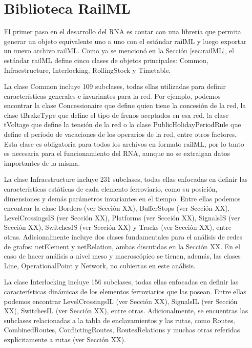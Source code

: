 \section{Biblioteca RailML}
	\label{sec:Biblioteca}
	
    El primer paso en el desarrollo del RNA es contar con una librería que permita generar un objeto equivalente uno a uno con el estándar railML y luego exportar un nuevo archivo railML. Como ya se mencionó en la Sección \ref{sec:railML}, el estándar railML define cinco clases de objetos principales: Common, Infraestructure, Interlocking, RollingStock y Timetable. 

    La clase Common incluye 109 subclases, todas ellas utilizadas para definir características generales e invariantes para la red. Por ejemplo, podemos encontrar la clase Concessionaire que define quien tiene la concesión de la red, la clase tBrakeType que define el tipo de frenos aceptados en esa red, la clase tVoltage que define la tensión de la red o la clase PublicHolidayPeriodRule que define el período de vacaciones de los operarios de la red, entre otros factores. Esta clase es obligatoria para todos los archivos en formato railML, por lo tanto es necesaria para el funcionamiento del RNA, aunque no se extraigan datos importantes de la misma.

    La clase Infraestructure incluye  231 subclases, todas ellas enfocadas en definir las características estáticas de cada elemento ferroviario, como su posición, dimensiones y demás parámetros invariantes en el tiempo.  Entre ellas podemos encontrar la clase Borders (ver Sección XX), BufferStops (ver Sección XX), LevelCrossingsIS (ver Sección XX), Platforms (ver Sección XX), SignalsIS (ver Sección XX), SwitchesIS (ver Sección XX) y Tracks (ver Sección XX), entre otras. Adicionalmente incluye dos clases fundamentales para el análisis de redes de grafos: netElement y netRelation, ambas discutidas en la Sección XX. En el caso de hacer análisis a nivel meso y macroscópico se tienen, además, las clases Line, OperationalPoint y Network, no cubiertas en este análisis.

    La clase Interlocking incluye 156 subclases, todas ellas enfocadas en definir las características dinámicas de los elementos ferroviarios que las posean. Entre ellas podemos encontrar LevelCrossingsIL (ver Sección XX), SignalsIL (ver Sección XX), SwitchesIL (ver Sección XX), entre otras. Adicionalmente, se encuentras las subclases relacionadas a la tabla de enclavamientos y las rutas, como Routes, CombinedRoutes, ConflictingRoutes, RoutesRelations y muchas otras referidas explícitamente a rutas (ver Sección XX). 
    
